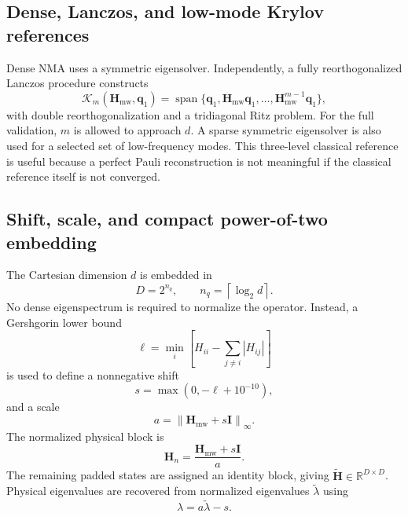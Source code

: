 \documentclass[aip,jcp,reprint,amsmath,amssymb,floatfix]{revtex4-2}
\newcommand{\Hmw}{\mathbf{H}_{\mathrm{mw}}}
\newcommand{\Hp}{\widetilde{\mathbf{H}}}
\newcommand{\norm}[1]{\left\lVert #1 \right\rVert}
\begin{document}
\subsection{Dense, Lanczos, and low-mode Krylov references}
\cite{Lanczos1950,Druskin1995Krylov}
Dense NMA uses a symmetric eigensolver. Independently, a fully reorthogonalized Lanczos procedure constructs
\begin{equation}
\mathcal{K}_m(\Hmw,\mathbf{q}_1)=
\operatorname{span}\{\mathbf{q}_1,\Hmw\mathbf{q}_1,\ldots,\Hmw^{m-1}\mathbf{q}_1\},
\end{equation}
with double reorthogonalization and a tridiagonal Ritz problem. For the full validation, $m$ is allowed to approach $d$. A sparse symmetric eigensolver is also used for a selected set of low-frequency modes. This three-level classical reference is useful because a perfect Pauli reconstruction is not meaningful if the classical reference itself is not converged.

\subsection{Shift, scale, and compact power-of-two embedding}
The Cartesian dimension $d$ is embedded in
\begin{equation}
D=2^{n_q},\qquad n_q=\left\lceil\log_2 d\right\rceil.
\label{eq:qubits}
\end{equation}
No dense eigenspectrum is required to normalize the operator. Instead, a Gershgorin lower bound
\begin{equation}
\ell=\min_i\left[H_{ii}-\sum_{j\neq i}|H_{ij}|\right]
\end{equation}
is used to define a nonnegative shift
\begin{equation}
s=\max(0,-\ell+10^{-10}),
\end{equation}
and a scale
\begin{equation}
a=\norm{\Hmw+s\mathbf{I}}_{\infty}.
\end{equation}
The normalized physical block is
\begin{equation}
\mathbf{H}_n=\frac{\Hmw+s\mathbf{I}}{a}.
\end{equation}
The remaining padded states are assigned an identity block, giving $\Hp\in\mathbb{R}^{D\times D}$. Physical eigenvalues are recovered from normalized eigenvalues $\tilde\lambda$ using
\begin{equation}
\lambda=a\tilde\lambda-s.
\label{eq:unscale}
\end{equation}
\end{document}
